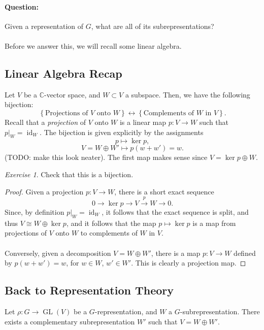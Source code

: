\documentclass[a4paper]{report}
\theoremstyle{definition}
\theoremstyle{remark}
\theoremstyle{proposition}
\theoremstyle{conjecture}
\theoremstyle{lemma}
\theoremstyle{corollary}
\theoremstyle{exercise}
\newtheorem{exercise}{Exercise}
\theoremstyle{example}
\newcommand{\C}{\mathbb{C}}
\newcommand{\on}{\operatorname}
\begin{document}
\paragraph{Question:} Given a representation of $G$, what are all of 
its subrepresentations?\\\\
Before we answer this, we will recall some linear algebra. 
\subsection{Linear Algebra Recap}

Let $V$ be a $\C$-vector space, and $W\subset V$ a subspace. Then, we 
have the following bijection:
$$\left\lbrace \text{Projections of $V$ onto $W$} \right\rbrace \longleftrightarrow \left\lbrace \text{Complements of $W$ in $V$}\right\rbrace.$$
Recall that a \emph{projection} of $V$ onto $W$ is a linear map 
$p: V \to W$ such that $p\vert_W = \on{id}_W$.
The bijection is given explicitly by the assignments $$p\longmapsto \ker p,$$
$$V = W \oplus W' \longmapsto p(w+w')=w.$$
(TODO: make this look neater).
The first map makes sense since $V = \ker p \oplus W$. 

\begin{exercise}
    Check that this is a bijection.
\end{exercise}

\begin{proof}
    Given a projection $p: V \to W$, there is a short 
    exact sequence 
    $$0 \longrightarrow \ker p \longrightarrow V \stackrel{p}{\longrightarrow} W \longrightarrow 0.$$
    Since, by definition $p\vert_W = \on{id}_W$, it follows that the 
    exact sequence is split, and thus $V \cong W \oplus \ker p$, and it
    follows that the map $p \longmapsto \ker p$ is a map from projections 
    of $V$ onto $W$ to complements of $W$ in $V$.\\\\
    Conversely, given a decomposition $V = W\oplus W'$, there is a map
    $p : V \to W$ defined by $p(w+w') = w$, for $w\in W$, $w' \in W'$.
    This is clearly a projection map. 
\end{proof}

\subsection{Back to Representation Theory}

\begin{theorem}
    Let $\rho : G \to \on{GL}(V)$ be a $G$-representation, and $W$ 
    a $G$-subrepresentation. There exists a complementary subrepresentation
    $W'$ such that $V = W\oplus W'$. 
\end{theorem}
\end{document}
